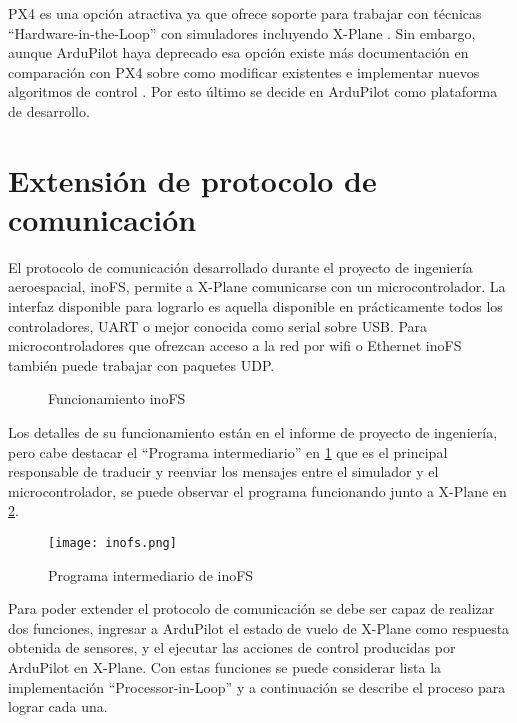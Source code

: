 PX4 es una opción atractiva ya que ofrece soporte para trabajar con técnicas ``Hardware-in-the-Loop'' con simuladores incluyendo X-Plane \cite{px4-hitl}. Sin embargo, aunque ArduPilot haya deprecado esa opción \cite{ap-hitl} existe más documentación en comparación con PX4 sobre como modificar existentes e implementar nuevos algoritmos de control \cite{ap-custom-controller}. Por esto último se decide en ArduPilot como plataforma de desarrollo.

\section{Extensión de protocolo de comunicación}

El protocolo de comunicación desarrollado durante el proyecto de ingeniería aeroespacial, inoFS, permite a X-Plane comunicarse con un microcontrolador. La interfaz disponible para lograrlo es aquella disponible en prácticamente todos los controladores, UART o mejor conocida como serial sobre USB. Para microcontroladores que ofrezcan acceso a la red por wifi o Ethernet inoFS también puede trabajar con paquetes UDP.

\begin{figure}[h]
    \centering
    
    \caption{Funcionamiento inoFS}
    \label{fig:inofs-diagrama}
\end{figure}

Los detalles de su funcionamiento están en el informe de proyecto de ingeniería, pero cabe destacar el ``Programa intermediario'' en \cref{fig:inofs-diagrama} que es el principal responsable de traducir y reenviar los mensajes entre el simulador y el microcontrolador, se puede observar el programa funcionando junto a X-Plane en \cref{fig:inofs-programa-intermediario}.

\begin{figure}[h]
    \centering
    \texttt{[image: inofs.png]}
    \caption{Programa intermediario de inoFS}
    \label{fig:inofs-programa-intermediario}
\end{figure}

Para poder extender el protocolo de comunicación se debe ser capaz de realizar dos funciones, ingresar a ArduPilot el estado de vuelo de X-Plane como respuesta obtenida de sensores, y el ejecutar las acciones de control producidas por ArduPilot en X-Plane. Con estas funciones se puede considerar lista la implementación ``Processor-in-Loop'' y a continuación se describe el proceso para lograr cada una.

